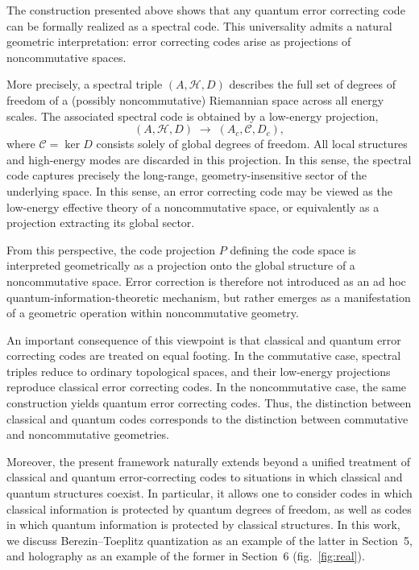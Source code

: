 \documentclass[12pt]{article}
\theoremstyle{definition} %
\theoremstyle{plain} %
\theoremstyle{remark} %
\theoremstyle{underline}
\begin{document}
The construction presented above shows that any quantum error correcting code can be formally realized as a spectral code. This universality admits a natural geometric interpretation: error correcting codes arise as projections of noncommutative spaces.

More precisely, a spectral triple $(A,\mathcal{H},D)$ describes the full set of degrees of freedom of a (possibly noncommutative) Riemannian space across all energy scales. The associated spectral code is obtained by a low-energy projection,
\[
    (A,\mathcal{H},D)
    \;\longrightarrow\;
    (A_c,\mathcal{C},D_c),
\]
where $\mathcal{C}=\ker D$ consists solely of global degrees of freedom. All local structures and high-energy modes are discarded in this projection. In this sense, the spectral code captures precisely the long-range, geometry-insensitive sector of the underlying space. In this sense, an error correcting code may be viewed as the low-energy effective theory of a noncommutative space, or equivalently as a projection extracting its global sector.

From this perspective, the code projection $P$ defining the code space is interpreted geometrically as a projection onto the global structure of a noncommutative space. Error correction is therefore not introduced as an ad hoc quantum-information-theoretic mechanism, but rather emerges as a manifestation of a geometric operation within noncommutative geometry.

An important consequence of this viewpoint is that classical and quantum error correcting codes are treated on equal footing. In the commutative case, spectral triples reduce to ordinary topological spaces, and their low-energy projections reproduce classical error correcting codes. In the noncommutative case, the same construction yields quantum error correcting codes. Thus, the distinction between classical and quantum codes corresponds to the distinction between commutative and noncommutative geometries.

Moreover, the present framework naturally extends beyond a unified treatment of classical and quantum error-correcting codes to situations in which classical and quantum structures coexist. In particular, it allows one to consider codes in which classical information is protected by quantum degrees of freedom, as well as codes in which quantum information is protected by classical structures. In this work, we discuss Berezin–Toeplitz quantization as an example of the latter in Section~5, and holography as an example of the former in Section~6 (fig.~\ref{fig:real}).
\end{document}
